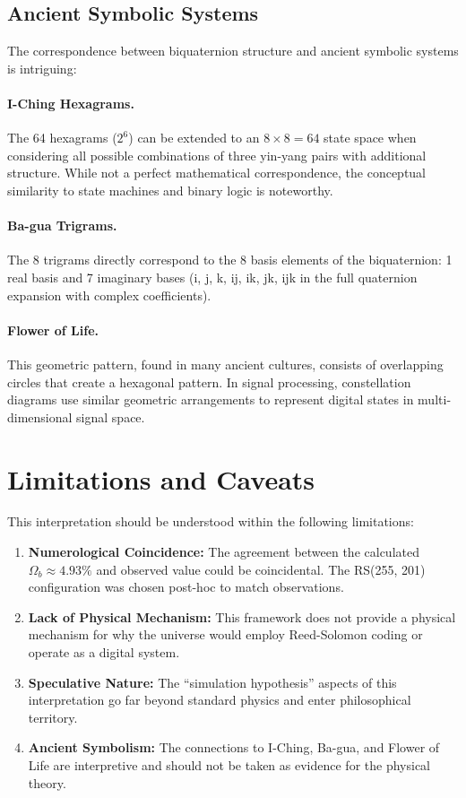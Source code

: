 \subsection{Ancient Symbolic Systems}

The correspondence between biquaternion structure and ancient symbolic systems is intriguing:

\paragraph{I-Ching Hexagrams.} The 64 hexagrams ($2^6$) can be extended to an $8 \times 8 = 64$ state space when considering all possible combinations of three yin-yang pairs with additional structure. While not a perfect mathematical correspondence, the conceptual similarity to state machines and binary logic is noteworthy.

\paragraph{Ba-gua Trigrams.} The 8 trigrams directly correspond to the 8 basis elements of the biquaternion: 1 real basis and 7 imaginary bases (i, j, k, ij, ik, jk, ijk in the full quaternion expansion with complex coefficients).

\paragraph{Flower of Life.} This geometric pattern, found in many ancient cultures, consists of overlapping circles that create a hexagonal pattern. In signal processing, constellation diagrams use similar geometric arrangements to represent digital states in multi-dimensional signal space.

\section{Limitations and Caveats}

This interpretation should be understood within the following limitations:

\begin{enumerate}
    \item \textbf{Numerological Coincidence:} The agreement between the calculated $\Omega_b \approx 4.93\%$ and observed value could be coincidental. The RS(255, 201) configuration was chosen post-hoc to match observations.
    
    \item \textbf{Lack of Physical Mechanism:} This framework does not provide a physical mechanism for why the universe would employ Reed-Solomon coding or operate as a digital system.
    
    \item \textbf{Speculative Nature:} The ``simulation hypothesis'' aspects of this interpretation go far beyond standard physics and enter philosophical territory.
    
    \item \textbf{Ancient Symbolism:} The connections to I-Ching, Ba-gua, and Flower of Life are interpretive and should not be taken as evidence for the physical theory.
\end{enumerate}

